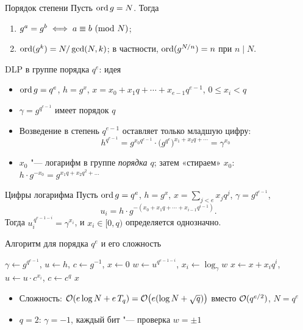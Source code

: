 \documentclass{ca-slides}
\begin{document}
\begin{theoremframe}[lemma]{Порядок степени}
  Пусть $\operatorname{ord} g = N$. Тогда
  \begin{enumerate}
    \item $g^a = g^b \iff a \equiv b \ (\mathrm{mod}\ N)$;
    \item $\operatorname{ord}(g^k) = N / \gcd(N, k)$; в частности, $\operatorname{ord}(g^{N/n}) = n$ при $n \mid N$.
  \end{enumerate}
\end{theoremframe}

\begin{canvasframe}{DLP в группе порядка $q^e$: идея}
  \begin{itemize}
    \item $\operatorname{ord} g = q^e$, $h = g^x$, \quad $x = x_0 + x_1 q + \cdots + x_{e-1} q^{e-1}$, \quad $0 \le x_i < q$
    \item $\gamma = g^{q^{e-1}}$ имеет порядок $q$
    \item Возведение в степень $q^{e-1}$ оставляет только младшую цифру:
      \[
        h^{q^{e-1}} = g^{x_0 q^{e-1}} \cdot \bigl(g^{q^e}\bigr)^{x_1 + x_2 q + \cdots} = \gamma^{x_0}
      \]
    \item $x_0$ "--- логарифм в группе \emph{порядка $q$}; затем «стираем» $x_0$:
      $h \cdot g^{-x_0} = g^{x_1 q + x_2 q^2 + \dots}$
  \end{itemize}
\end{canvasframe}

\begin{theoremframe}{Цифры логарифма}
  Пусть $\operatorname{ord} g = q^e$, $h = g^x$, $x = \sum_{j<e} x_j q^j$, $\gamma = g^{q^{e-1}}$,
  \[
    u_i = h \cdot g^{-(x_0 + x_1 q + \cdots + x_{i-1} q^{i-1})}.
  \]
  Тогда $u_i^{\,q^{e-1-i}} = \gamma^{x_i}$, и $x_i \in [0, q)$ определяется однозначно.
\end{theoremframe}

\begin{canvasframe}{Алгоритм для порядка $q^e$ и его сложность}
  \small
  \begin{algorithmic}[1]
    \State $\gamma \gets g^{q^{e-1}}$, \quad $u \gets h$, \quad $c \gets g^{-1}$, \quad $x \gets 0$
      \State $w \gets u^{q^{e-1-i}}$, \quad $x_i \gets \log_\gamma w$ 
      \State $x \gets x + x_i q^i$, \quad $u \gets u \cdot c^{x_i}$, \quad $c \gets c^q$
    \EndFor
    \State \Return $x$ 
  \end{algorithmic}
  \medskip
  \begin{itemize}
    \item Сложность: $\mathcal{O}(e \log N + e\,T_q) = \mathcal{O}\bigl(e(\log N + \sqrt q)\bigr)$ вместо
      $\mathcal{O}(q^{e/2})$, \quad $N = q^e$
    \item $q = 2$: $\gamma = -1$, каждый бит "--- проверка $w = \pm 1$
  \end{itemize}
\end{canvasframe}
\end{document}
